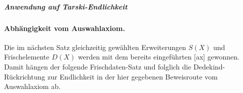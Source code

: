 \documentclass[main.tex]{subfiles}
\begin{document}
\subparagraph{Anwendung auf Tarski-Endlichkeit}

\paragraph{Abhängigkeit vom Auswahlaxiom.}
Die im nächsten Satz gleichzeitig gewählten Erweiterungen \(S(X)\) und
Frischelemente \(D(X)\) werden mit dem bereits eingeführten
[ax] gewonnen. Damit hängen der folgende
Frischdaten-Satz und folglich die Dedekind-Rückrichtung zur Endlichkeit in
der hier gegebenen Beweisroute vom Auswahlaxiom ab.

\end{document}
